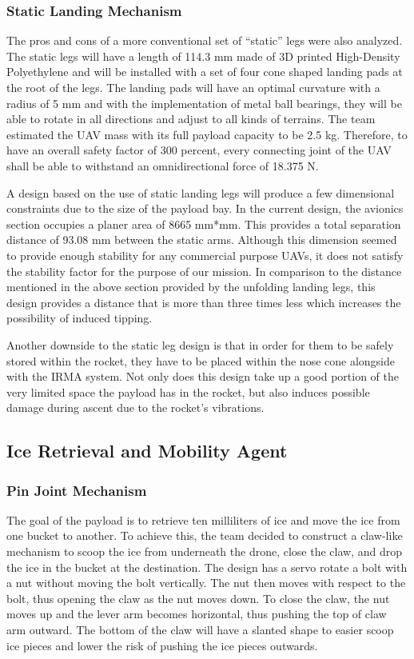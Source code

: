 		\subsubsection{Static Landing Mechanism}
            The pros and cons of a more conventional set of “static” legs were also analyzed. The static legs will have a length of 114.3 mm made of 3D printed High-Density Polyethylene and will be installed with a set of four cone shaped landing pads at the root of the legs. The landing pads will have an optimal curvature with a radius of 5 mm and with the implementation of metal ball bearings, they will be able to rotate in all directions and adjust to all kinds of terrains. The team estimated the UAV mass with its full payload capacity to be 2.5 kg. Therefore, to have an overall safety factor of 300 percent, every connecting joint of the UAV shall be able to withstand an omnidirectional force of 18.375 N. 

            A design based on the use of static landing legs will produce a few dimensional constraints due to the size of the payload bay. In the current design, the avionics section occupies a planer area of 8665 mm*mm. This provides a total separation distance of 93.08 mm between the static arms. Although this dimension seemed to provide enough stability for any commercial purpose UAVs, it does not satisfy the stability factor for the purpose of our mission. In comparison to the distance mentioned in the above section provided by the unfolding landing legs, this design provides a distance that is more than three times less which increases the possibility of induced tipping. 
            
            Another downside to the static leg design is that in order for them to be safely stored within the rocket, they have to be placed within the nose cone alongside with the IRMA system. Not only does this design take up a good portion of the very limited space the payload has in the rocket, but also induces possible damage during ascent due to the rocket’s vibrations.  
              

	\subsection{Ice Retrieval and Mobility Agent}
		\subsubsection{Pin Joint Mechanism}
			The goal of the payload is to retrieve ten milliliters of ice and move the ice from one bucket to another. To achieve this, the team decided to construct a claw-like mechanism to scoop the ice from underneath the drone, close the claw, and drop the ice in the bucket at the destination. The design has a servo rotate a bolt with a nut without moving the bolt vertically. The nut then moves with respect to the bolt, thus opening the claw as the nut moves down. To close the claw, the nut moves up and the lever arm becomes horizontal, thus pushing the top of claw arm outward. The bottom of the claw will have a slanted shape to easier scoop ice pieces and lower the risk of pushing the ice pieces outwards. 

